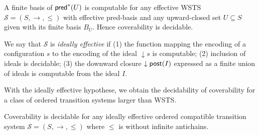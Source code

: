\begin{theorem}\cite{DBLP:journals/tcs/FinkelS01,DBLP:journals/iandc/AbdullaCJT00}
A finite basis of $ \textsf{pred}^*(U)$ is computable for any effective WSTS $\mathscr{S}=(S, \rightarrow, \leq)$ with effective pred-basis and any upward-closed set $U \subseteq S$ given with its finite basis $B_U$. Hence coverability is decidable.
\end{theorem}


We say that $\mathscr{S}$
is {\em ideally effective} \cite{BFM-ic17} if (1) the function mapping the encoding of a configuration $s$
to the encoding of the ideal $\downarrow s$ is computable; (2) inclusion of ideals is decidable; (3) the downward closure $\downarrow \post(I)$ expressed as a finite union of ideals is computable from the ideal $I$.
%
\iffalse
\alain{pas ici}
\begin{definition}{\cite{BFM-ic17}} 
A class $C$ of WSTS is {\em ideally effective} if
\begin{itemize}
\item the function mapping the encoding of a configuration $s$ of a WSTS
to the encoding of the ideal $\downarrow s$ is computable;
\item inclusion of ideals is decidable;
\item the downward closure $\downarrow \post(I)$ expressed as a finite union of ideals is computable from the ideal $I$.
\end{itemize}
\end{definition}
%
\fi
%
%
With the ideally effective hypothese, we obtain the decidability of coverability for a class of ordered transition systems larger than WSTS.

\begin{theorem}\cite{BFM-ic17}
Coverability is decidable for any ideally effective ordered compatible transition system $\mathscr{S}=(S, \rightarrow, \leq)$ where $\leq$ is without infinite antichains.
\end{theorem}








